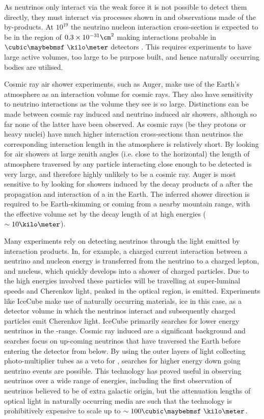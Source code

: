 As neutrinos only interact via the weak force it is not possible to detect them directly, they must interact via processes shown in  and observations made of the by-products. At $10^{19}$ \eV the neutrino nucleon interaction cross-section is expected to be in the region of $0.3 \times 10^{-31} \cm^{2}$ making interactions probable in $\cubic\km$ detectors \cite{Gandhi199681}. This requires experiments to have large active volumes, too large to be purpose built, and hence naturally occurring bodies are utilised.

Cosmic ray air shower experiments, such as Auger, make use of the Earth's atmosphere as an interaction volume for cosmic rays. They also have sensitivity to neutrino interactions as the volume they see is so large. Distinctions can be made between cosmic ray induced and neutrino induced air showers, although so far none of the latter have been observed. As cosmic rays (be they protons or heavy nuclei) have much higher interaction cross-sections than neutrinos the corresponding interaction length in the atmosphere is relatively short. By looking for air showers at large zenith angles (i.e. close to the horizontal) the length of atmosphere traversed by any particle interacting close enough to be detected is very large, and therefore highly unlikely to be a cosmic ray. Auger is most sensitive to \Pnut by looking for showers induced by the decay products of a \Ptau after the propagation and interaction of a \Pnut in the Earth. The inferred shower direction is required to be Earth-skimming or coming from a nearby mountain range, with the effective volume set by the decay length of \Ptau at high energies ($\sim 10 \kilo\meter$).


Many experiments rely on detecting neutrinos through the light emitted by interaction products. In, for example, a charged current interaction between a neutrino and nucleon energy is transferred from the neutrino to a charged lepton, and nucleus, which quickly develops into a shower of charged particles. Due to the high energies involved these particles will be travelling at super-luminal speeds and Cherenkov light, peaked in the optical region, is emitted. Experiments like IceCube make use of naturally occurring materials, ice in this case, as a detector volume in which the neutrinos interact and subsequently charged particles emit Cherenkov light. IceCube primarily searches for lower energy neutrinos in the \TeV-\PeV range. Cosmic ray induced \Pmu are a significant background and searches focus on up-coming neutrinos that have traversed the Earth before entering the detector from below. By using the outer layers of light collecting photo-multiplier tubes as a veto for \Pmu, searches for higher energy down going neutrino events are possible. This technology has proved useful in observing neutrinos over a wide range of energies, including the first observation of neutrinos believed to be of extra galactic origin, but the attenuation lengths of optical light in naturally occurring media are such that the technology is prohibitively expensive to scale up to $\sim 100 \cubic\km$.



